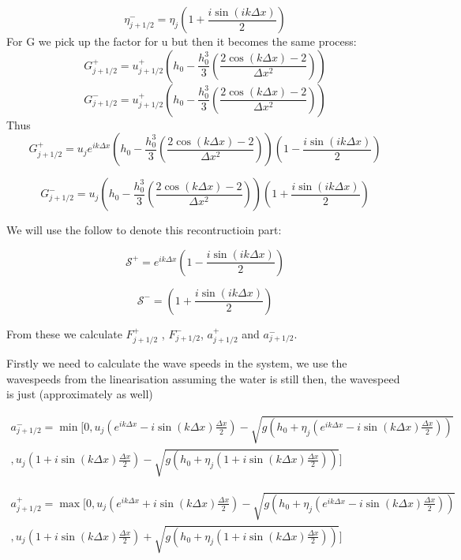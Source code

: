\documentclass[12pt]{article}
\begin{document}
\[\eta^-_{j + 1/2} = \eta_{j}\left( 1 + \frac{i\sin\left({ik\Delta x}\right) }{2}\right) \]
For G we pick up the factor for u but then it becomes the same process:
\[G^+_{j + 1/2} = u^+_{j + 1/2} \left( h_0 -  \frac{h_0^3}{3} \left(\dfrac{2\cos\left(k{\Delta x}\right) - 2}{\Delta x^2}\right) \right)\]
\[G^-_{j + 1/2} = u^+_{j + 1/2} \left( h_0 -  \frac{h_0^3}{3} \left(\dfrac{2\cos\left(k{\Delta x}\right) - 2}{\Delta x^2}\right) \right)\]
Thus
\[G^+_{j + 1/2} = u_{j} e^{ik\Delta x}  \left( h_0 -  \frac{h_0^3}{3} \left(\dfrac{2\cos\left(k{\Delta x}\right) - 2}{\Delta x^2}\right) \right)  \left(1 -\frac{i \sin\left(ik\Delta x\right)  }{2} \right) \]

\[G^-_{j + 1/2} = u_{j}\left( h_0 -  \frac{h_0^3}{3} \left(\dfrac{2\cos\left(k{\Delta x}\right) - 2}{\Delta x^2}\right) \right)\left( 1 + \frac{i\sin\left({ik\Delta x}\right) }{2}\right) \]
\newline
\newline
\newline
\newline
\newline
\newline

We will use the follow to denote this recontructioin part:

\[\mathcal{S^+} =  e^{ik\Delta x}   \left(1 -\frac{i \sin\left(ik\Delta x\right)  }{2} \right)\]

\[\mathcal{S^-} =  \left( 1 + \frac{i\sin\left({ik\Delta x}\right) }{2}\right)\]

From these  we calculate $F^+_{j + 1/2}$ , $F^-_{j + 1/2}$, $a_{j + 1/2}^+$ and $a_{j + 1/2}^{-}$. 

Firstly we need to calculate the wave speeds in the system, we use the wavespeeds from the linearisation assuming the water is still then, the wavespeed is just (approximately as well)

\begin{multline*}
a^-_{j + 1/2} = \min [0, u_j\left(e^{ik\Delta x} -  i\sin\left(k \Delta x\right) \frac{\Delta x}{2} \right) - \sqrt{g\left(h_0 + \eta_j\left(e^{ik\Delta x} -  i\sin\left(k \Delta x\right) \frac{\Delta x}{2} \right) \right) } \\,
u_j\left(1 + i\sin\left(k \Delta x\right) \frac{\Delta x}{2} \right)  - \sqrt{g\left(h_0 + \eta_j\left(1 + i\sin\left(k \Delta x\right) \frac{\Delta x}{2} \right) \right) }
 ]
\end{multline*}

\begin{multline*}
a^+_{j + 1/2} = \max [0, u_j\left(e^{ik\Delta x} +  i\sin\left(k \Delta x\right) \frac{\Delta x}{2} \right) - \sqrt{g\left(h_0 + \eta_j\left(e^{ik\Delta x} -  i\sin\left(k \Delta x\right) \frac{\Delta x}{2} \right) \right) } \\,
u_j\left(1 + i\sin\left(k \Delta x\right) \frac{\Delta x}{2} \right)  + \sqrt{g\left(h_0 + \eta_j\left(1 + i\sin\left(k \Delta x\right) \frac{\Delta x}{2} \right) \right) }
]
\end{multline*}
\end{document}

